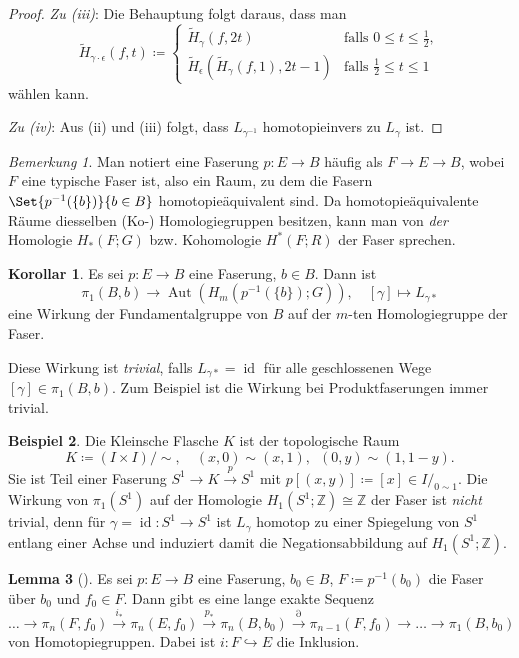 \documentclass[11pt, a4paper, german]{article}
\theoremstyle{definition}
\newtheorem{lem}{Lemma}
\newtheorem{bsp}[lem]{Beispiel}
\newtheorem{kor}[lem]{Korollar}
\theoremstyle{remark}
\newtheorem*{bem}{Bemerkung}
\newcommand{\Z}{\mathbb{Z}} %
\DeclareMathOperator{\id}{id} %
\DeclareMathOperator{\Aut}{Aut} %
\newcommand{\I}{I} %
\newcommand{\fall}[1]{\emph{#1}:\enspace}
\begin{document}
\begin{proof}
  \fall{Zu (iii)} Die Behauptung folgt daraus, dass man
  \[
    \tilde{H}_{\gamma \cdot \epsilon}(f, t) \coloneqq \begin{cases}
      \tilde{H}_\gamma(f, 2t) & \text{falls } 0 \leq t \leq \tfrac{1}{2}, \\
      \tilde{H}_\epsilon(\tilde{H}_\gamma(f, 1), 2t - 1) & \text{falls } \tfrac{1}{2} \leq t \leq 1
    \end{cases}
  \]
  wählen kann.

  \fall{Zu (iv)} Aus (ii) und (iii) folgt, dass $L_{\gamma^{-1}}$ homotopieinvers zu $L_\gamma$ ist.
\end{proof}

\begin{bem}
  Man notiert eine Faserung $p : E \to B$ häufig als $F \to E \to B$, wobei $F$ eine typische Faser ist, also ein Raum, zu dem die Fasern $\Set{p^{-1}(\{b\})}{b \in B}$ homotopieäquivalent sind.
  Da homotopieäquivalente Räume diesselben (Ko-) Homologiegruppen besitzen, kann man von \emph{der} Homologie $H_*(F; G)$ bzw. Kohomologie $H^*(F; R)$ der Faser sprechen.
\end{bem}

\begin{kor}
  Es sei $p : E \to B$ eine Faserung, $b \in B$.
  Dann ist
  \[
    \pi_1(B, b) \to \Aut(H_m(p^{-1}(\{b\}); G)), \quad
    [\gamma] \mapsto L_{\gamma*}
  \]
  eine Wirkung der Fundamentalgruppe von $B$ auf der $m$-ten Homologiegruppe der Faser.
\end{kor}

Diese Wirkung ist \emph{trivial}, falls $L_{\gamma*} = \id$ für alle geschlossenen Wege $[\gamma] \in \pi_1(B, b)$.
Zum Beispiel ist die Wirkung bei Produktfaserungen immer trivial.

\begin{bsp}
  Die Kleinsche Flasche $K$ ist der topologische Raum
  \[
    K \coloneqq (\I \times \I)/{\sim}, \quad
    (x, 0) \sim (x, 1), \enspace
    (0, y) \sim (1, 1-y).
  \]
  Sie ist Teil einer Faserung $S^1 \to K \xrightarrow{p} S^1$ mit $p[(x,y)] \coloneqq [x] \in I/_{0 \sim 1}$.
  Die Wirkung von $\pi_1(S^1)$ auf der Homologie $H_1(S^1; \Z) \cong \Z$ der Faser ist \emph{nicht} trivial, denn für $\gamma = \id : S^1 \to S^1$ ist $L_\gamma$ homotop zu einer Spiegelung von $S^1$ entlang einer Achse und induziert damit die Negationsabbildung auf $H_1(S^1; \Z)$.
\end{bsp}

\begin{lem}[{\cite[Thm 4.41]{hatcher:at}}]
  Es sei $p : E \to B$ eine Faserung, $b_0 \in B$, $F \coloneqq p^{-1}(b_0)$ die Faser über $b_0$ und $f_0 \in F$.
  Dann gibt es eine lange exakte Sequenz
  \[ \ldots \to \pi_n(F, f_0) \xrightarrow{i_*} \pi_n(E, f_0) \xrightarrow{p_*} \pi_n(B, b_0) \xrightarrow{\partial} \pi_{n-1}(F, f_0) \to \ldots \to \pi_1(B, b_0) \]
  von Homotopiegruppen.
  Dabei ist $i : F \hookrightarrow E$ die Inklusion.
\end{lem}
\end{document}
